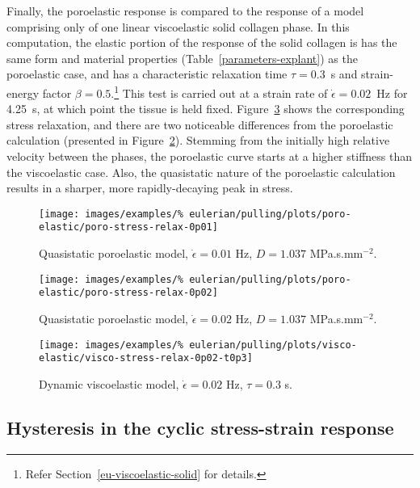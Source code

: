 Finally, the poroelastic response is compared to the response of a
model comprising only of one linear viscoelastic solid collagen
phase. In this computation, the elastic portion of the response of the
solid collagen is has the same form and material properties
(Table~\ref{parameters-explant}) as the poroelastic case, and has a
characteristic relaxation time $\tau=0.3$~s and strain-energy factor
$\beta=0.5$.\footnote{Refer Section~\ref{eu-viscoelastic-solid} for
  details.} This test is carried out at a strain rate
of $\dot{\epsilon}=0.02$~Hz for 4.25~s, at which point the tissue is
held fixed. Figure~\ref{visco-stress-relax-0p02-t0p3} shows the
corresponding stress relaxation, and there are two noticeable 
differences from the poroelastic calculation (presented in
Figure~\ref{poro-stress-relax-0p02}). Stemming
from the initially high relative velocity between the phases, the
poroelastic curve starts at a higher stiffness than the viscoelastic
case. Also, the quasistatic nature of the poroelastic calculation
results in a sharper, more rapidly-decaying peak in stress.

\clearpage

\begin{figure}[!hptb]
\centering
\texttt{[image: images/examples/\%
eulerian/pulling/plots/poro-elastic/poro-stress-relax-0p01]}
\caption{Quasistatic poroelastic model, $\dot{\epsilon}=0.01$ Hz,
  $D=1.037$ MPa.s.mm$^{-2}$.}
\label{poro-stress-relax-0p01}
\end{figure}

\begin{figure}[!hptb]
\centering
\texttt{[image: images/examples/\%
eulerian/pulling/plots/poro-elastic/poro-stress-relax-0p02]}
\caption{Quasistatic poroelastic model, $\dot{\epsilon}=0.02$ Hz,
  $D=1.037$ MPa.s.mm$^{-2}$.}
\label{poro-stress-relax-0p02}
\end{figure}

\begin{figure}[!hptb]
\centering
\texttt{[image: images/examples/\%
eulerian/pulling/plots/visco-elastic/visco-stress-relax-0p02-t0p3]}
\caption{Dynamic viscoelastic model, $\dot{\epsilon}=0.02$ Hz,
  $\tau=0.3$ s.}
\label{visco-stress-relax-0p02-t0p3}
\end{figure}

\subsection{Hysteresis in the cyclic stress-strain response}
\label{hysteresis}

